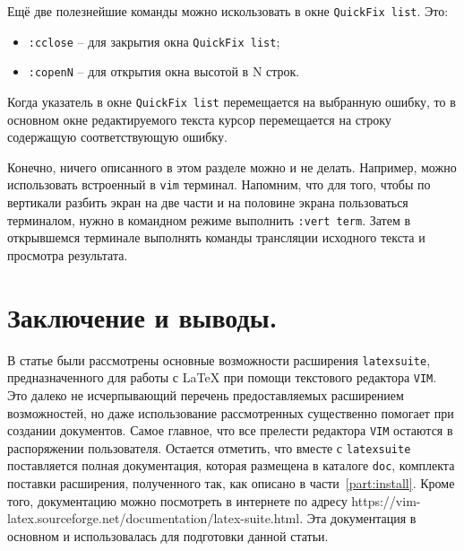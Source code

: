 \documentclass[a4paper]{article}
\begin{document}
Ещё две полезнейшие команды можно искользовать в окне \texttt{QuickFix list}. Это:
\begin{itemize}
	\item \verb|:cclose| -- для закрытия окна \texttt{QuickFix list};
	\item \verb|:copenN| -- для открытия окна высотой в N строк.
	\end{itemize}
Когда указатель в окне \texttt{QuickFix list} перемещается на выбранную ошибку, то в основном
окне редактируемого текста курсор перемещается на строку содержащую соответствующую ошибку.

Конечно, ничего описанного в этом разделе можно и не делать. Например, можно использовать
встроенный в \texttt{vim} терминал. Напомним, что для того, чтобы по вертикали разбить 
экран на две части и на половине экрана пользоваться терминалом, нужно в командном режиме
выполнить \texttt{:vert term}. Затем в открывшемся терминале выполнять команды трансляции
исходного текста и просмотра результата. 

\part{Заключение и выводы.}
В статье были рассмотрены основные возможности расширения \texttt{latexsuite}, 
предназначенного для работы с \LaTeX{} при помощи текстового редактора \texttt{VIM}.
Это далеко не исчерпывающий перечень предоставляемых расширением возможностей, но даже 
использование рассмотренных существенно помогает при создании документов. Самое главное, 
что все прелести редактора \texttt{VIM} остаются в распоряжении пользователя. 
Остается отметить, что вместе с \texttt{latexsuite} поставляется полная документация,
которая размещена в каталоге \texttt{doc}, комплекта поставки расширения, полученного
так, как описано в части~\ref{part:install}. Кроме того, документацию можно посмотреть 
в интернете по адресу https://vim-latex.sourceforge.net/documentation/latex-suite.html.
Эта документация в основном и использовалась для подготовки данной статьи. 
\end{document}
